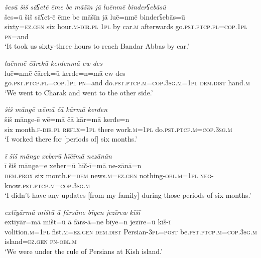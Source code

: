 \ea \label{ŽM.33}
\textit{šesū šiš sāʕetē ēme be māšīn jā luēnmē binderʕebāsū} \\ 
\gll šes=ū šiš sāʕet-ē ēme be māšīn jā luē=nmē binderʕebās=ū \\ 
 sixty\textsc{=ez.gen} six hour\textsc{.m}\textsc{-dir}\textsc{.pl} \textsc{1pl} by car\textsc{.m} afterwards go\textsc{.pst}\textsc{.ptcp}\textsc{.pl}\textsc{=cop}\textsc{.\textsc{1pl}} \textsc{pn}=and \\ 
\glt `It took us sixty-three hours to reach Bandar Abbas by car.'
\z 
 
\ea \label{ŽM.34}
\textit{luēnmē čārekū kerdenmā ew des} \\ 
\gll luē=nmē čārek=ū kerde=n=mā ew des \\ 
 go\textsc{.pst}\textsc{.ptcp}\textsc{.pl}\textsc{=cop}\textsc{.\textsc{1pl}} \textsc{pn}=and do\textsc{.pst}\textsc{.ptcp}\textsc{.m}\textsc{=cop}\textsc{.3sg}\textsc{.m}\textsc{=\textsc{1pl}} \textsc{dem.dist} hand\textsc{.m} \\ 
\glt `We went to Charak and went to the other side.'
\z 
 
\ea \label{ŽM.35}
\textit{šiš māngē wēmā čā kārmā kerđen} \\ 
\gll šiš mānge-ē wē=mā čā kār=mā kerđe=n \\ 
 six month\textsc{.f}\textsc{-dir}\textsc{.pl} \textsc{reflx}\textsc{=\textsc{1pl}} there work\textsc{.m}\textsc{=\textsc{1pl}} do\textsc{.pst}\textsc{.ptcp}\textsc{.m}\textsc{=cop}\textsc{.3sg}\textsc{.m} \\ 
\glt `I worked there for [periods of] six months.'
\z 
 
\ea \label{ŽM.36}
\textit{ī šiš mānge xeberū hīčīmā nezānān} \\ 
\gll ī šiš mānge=e xeber=ū hīč-ī=mā ne-zānā=n \\ 
 \textsc{dem.prox} six month\textsc{.f}\textsc{=dem} news\textsc{.m}\textsc{=ez.gen} nothing\textsc{-obl}\textsc{.m}\textsc{=\textsc{1pl}} \textsc{neg-}know\textsc{.pst}\textsc{.ptcp}\textsc{.m}\textsc{=cop}\textsc{.3sg}\textsc{.m} \\ 
\glt `I didn’t have any updates [from my family] during those periods of six months.'
\z 
 
\ea \label{ŽM.38}
\textit{extīyārmā mištū ā fārsāne bīyen jezīrew kīšī} \\ 
\gll extīyār=mā mišt=ū ā fārs-ā=ne bīye=n jezīre=ū kīš-ī \\ 
 volition\textsc{.m}\textsc{=\textsc{1pl}} fist\textsc{.m}\textsc{=ez.gen} \textsc{dem.dist} Persian\textsc{-3pl}\textsc{=\textsc{post}} be\textsc{.pst}\textsc{.ptcp}\textsc{.m}\textsc{=cop}\textsc{.3sg}\textsc{.m} island\textsc{=ez.gen} \textsc{pn}\textsc{-obl}\textsc{.m} \\ 
\glt `We were under the rule of Persians at Kish island.'
\z 
 
